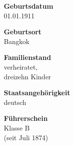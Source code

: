 \documentclass{article}
\begin{document}
\begin{minipage}[t]{0.4\textwidth}
\begin{flushright}	
\textbf{Geburtsdatum}\\
	01.01.1911\\\vspace{2 cm}
	
	\textbf{Geburtsort}\\
	Bangkok
	\\\vspace{2 cm}
		
	\textbf{Familienstand}\\
	verheiratet,\\
	dreizehn Kinder\\\vspace{2 cm}
		
	\textbf{Staatsangehörigkeit}\\
	deutsch\\\vspace{2 cm}

	
	\textbf{Führerschein}\\
	Klasse B\\
	(seit Juli 1874)\\
\end{flushright}
\end{minipage}
\end{document}
